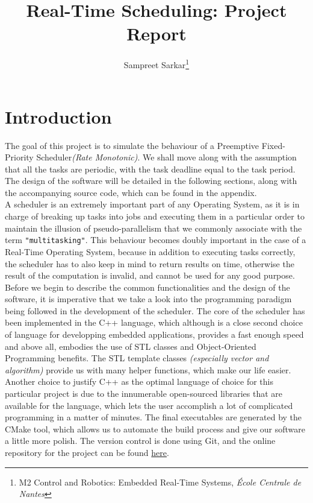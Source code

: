 



\title{Real-Time Scheduling: Project Report}
\author{Sampreet Sarkar\footnote{M2 Control and Robotics: Embedded Real-Time Systems, \textit{\'Ecole Centrale de Nantes}}}
\date{}


\nocite{*}
\maketitle

\section{Introduction}
The goal of this project is to simulate the behaviour of a Preemptive Fixed-Priority Scheduler\textit{(Rate Monotonic)}. We shall move along with the assumption that all the tasks are periodic, with the task deadline equal to the task period. The design of the software will be detailed in the following sections, along with the accompanying source code, which can be found in the appendix.\\

A scheduler is an extremely important part of any Operating System, as it is in charge of breaking up tasks into jobs and executing them in a particular order to maintain the illusion of pseudo-parallelism that we commonly associate with the term \texttt{"multitasking"}. This behaviour becomes doubly important in the case of a Real-Time Operating System, because in addition to executing tasks correctly, the scheduler has to also keep in mind to return results on time, otherwise the result of the computation is invalid, and cannot be used for any good purpose.\\

Before we begin to describe the common functionalities and the design of the software, it is imperative that we take a look into the programming paradigm being followed in the development of the scheduler. The core of the scheduler has been implemented in the C++ language, which although is a close second choice of language for developping embedded applications, provides a fast enough speed and above all, embodies the use of STL classes and Object-Oriented Programming benefits. The STL template classes \textit{(especially vector and algorithm)} provide us with many helper functions, which make our life easier. Another choice to justify C++ as the optimal language of choice for this particular project is due to the innumerable open-sourced libraries that are available for the language, which lets the user accomplish a lot of complicated programming in a matter of minutes. The final executables are generated by the CMake\cite{cmake} tool, which allows us to automate the build process and give our software a little more polish. The version control is done using Git, and the online repository for the project can be found \href{https://github.com/sampreets3/scheduler-RM}{here}.\\

